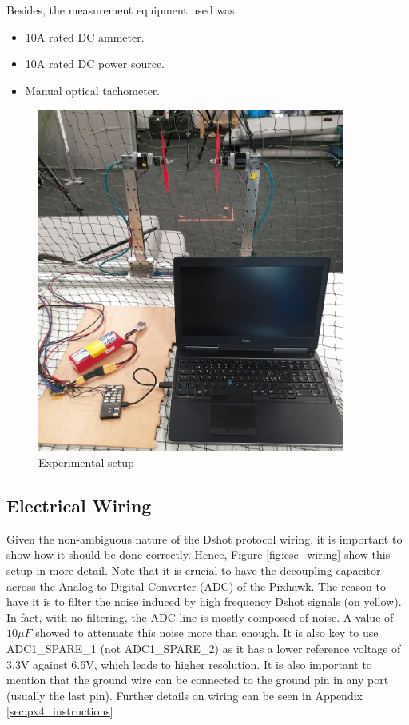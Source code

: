 Besides, the measurement equipment used was:

\begin{itemize}
		\item 10A rated DC ammeter.
		\item 10A rated DC power source.
		\item Manual optical tachometer.
\end{itemize}


\begin{figure} 
    \centering
    \includegraphics[width=0.9\textwidth]{images/setup_photo.png}
    \caption{Experimental setup}
    \label{fig:exp_setup}
\end{figure}


\subsection{Electrical Wiring}
Given the non-ambiguous nature of the Dshot protocol wiring, it is important to show how it should be done correctly. Hence, Figure \ref{fig:esc_wiring} show this setup in more detail.
\newline
Note that it is crucial to have the decoupling capacitor across the Analog to Digital Converter (ADC) of the Pixhawk. The reason to have it is to filter the noise induced by high frequency Dshot signals (on yellow). In fact, with no filtering, the ADC line is mostly composed of noise. A value of $10\mu F$ showed to attenuate this noise more than enough. It is also key to use ADC1\_SPARE\_1 (not ADC1\_SPARE\_2) as it has a lower reference voltage of 3.3V against 6.6V, which leads to higher resolution.
\newline
It is also important to mention that the ground wire can be connected to the ground pin in any port (usually the last pin). Further details on wiring can be seen in Appendix \ref{sec:px4_instructions}

